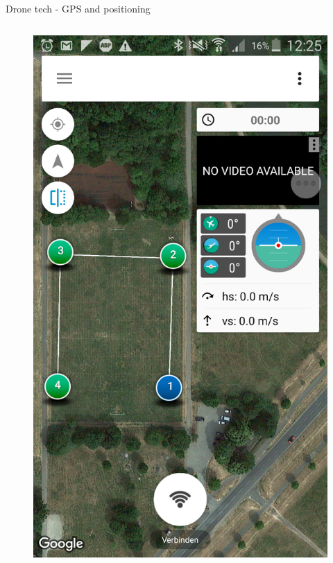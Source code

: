\documentclass[aspectratio=169]{beamer}
\begin{document}
\begin{frame}{Drone tech - GPS and positioning}
	\begin{columns}
	
	\begin{column}{.25\textwidth}
	\begin{figure}
		\includegraphics[width=1\linewidth]{images/qrx350pro_3drcontrol.png}\\
		\color{gray}{Tower android app}
	\end{figure}
	\end{column}
	

\end{columns}
\end{frame}
\end{document}
